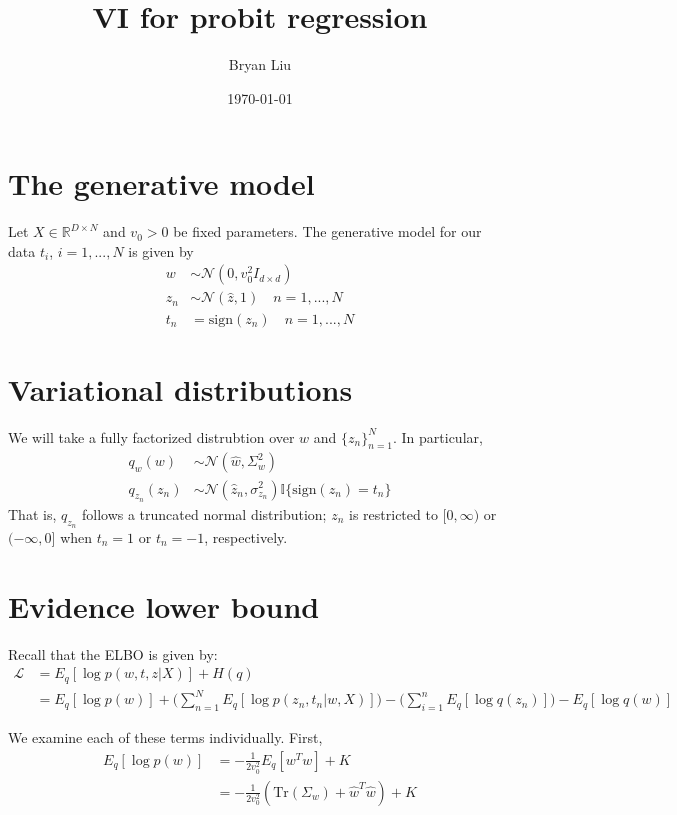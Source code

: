 \documentclass[10pt]{article}
\theoremstyle{plain}
\theoremstyle{definition}
\newcommand\reals{{\mathbb R}}
\newcommand{\<}{\langle}
\renewcommand{\>}{\rangle}
\begin{document}
%

\title{VI for probit regression}
\author{Bryan Liu}


\date{\today}

\maketitle



\section{The generative model}
Let $X\in \reals^{D\times N}$ and $v_0>0$ be fixed parameters. The generative model for our data $t_i$, $i= 1,..., N$ is given by
\begin{align}
w &\sim \mathcal N(0, v_0^2 I_{d\times d})\\
z_n &\sim \mathcal N(\hat z, 1) \quad n = 1, ..., N\\
t_n &= \text{sign}(z_n)\quad n = 1, ..., N
\end{align}

\section{Variational distributions}
We will take a fully factorized distrubtion over $w$ and $\{z_n\}_{n=1}^N$. In particular, 
\begin{align}
q_w(w) &\sim \mathcal N (\hat w, \Sigma^2_w)\\
q_{z_n}(z_n) &\sim \mathcal{N}(\hat z_n, \sigma^2_{z_n})\mathbb I\{\text{sign}(z_n) = t_n\}
\end{align}
That is, $q_{z_n}$ follows a truncated normal distribution; $z_n$ is restricted to $[0,\infty)$ or $(-\infty,  0]$ when $t_n=1$ or $t_n=-1$, respectively. 

\section{Evidence lower bound}
Recall that the ELBO is given by:
\begin{align}
\mathcal L &= E_q[\log p(w,t,z|X)] + H(q) \\
	&=  E_q[\log p(w)] + \Big(\sum_{n=1}^N E_q[\log p(z_n,t_n|w,X)]\Big) - \Big(\sum_{i=1}^n E_q[\log q(z_n)]\Big) - E_q[\log q(w)] 
\end{align} 

We examine each of these terms individually. First, 
\begin{align}
E_q[\log p(w)] &= -\frac{1}{2v_0^2} E_q[w^Tw] + K\\
	&= -\frac{1}{2v_0^2} (\text{Tr}(\Sigma_w) + \hat w^T \hat w) + K
\end{align}
\end{document}
